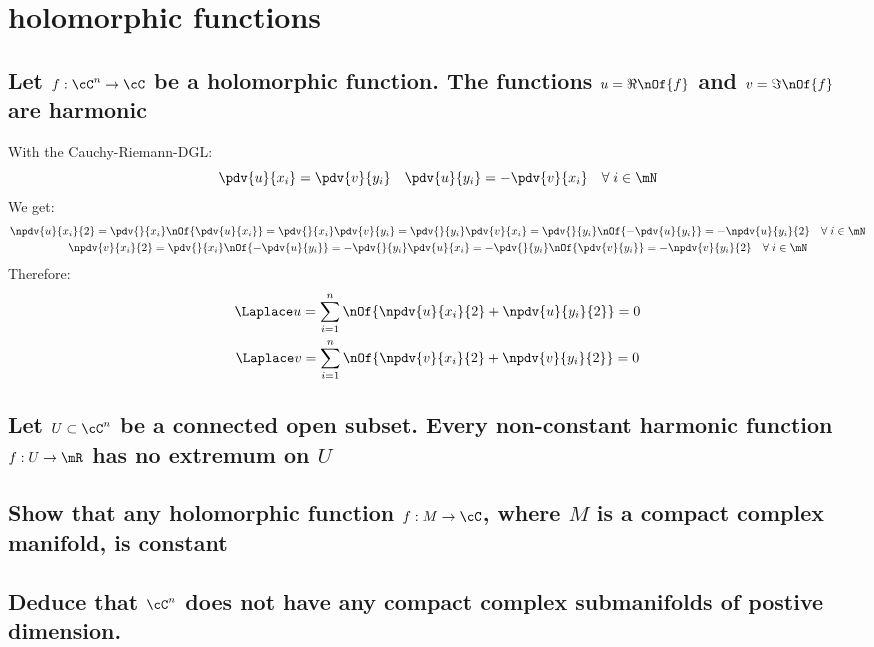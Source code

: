 \documentclass[11pt,a4paper]{scrartcl}
\begin{document}
	\section{holomorphic functions}

	\subsection{Let $f : \cC^n \to \cC$ be a holomorphic function.	The functions $u=\Re\nOf{f}$ and $v=\Im\nOf{f}$ are harmonic}
	With the Cauchy-Riemann-DGL:
	\begin{equation}
		\pdv{u}{x_i} = \pdv{v}{y_i} \quad \pdv{u}{y_i} = - \pdv{v}{x_i} \quad \forall\; i\in\mN
	\end{equation}
	We get:
	\begin{gather}
		\npdv{u}{x_i}{2}  = \pdv{}{x_i}\nOf{\pdv{u}{x_i}} = \pdv{}{x_i} \pdv{v}{y_i} = \pdv{}{y_i}\pdv{v}{x_i} = \pdv{}{y_i}\nOf{-\pdv{u}{y_i}} = - \npdv{u}{y_i}{2} \quad \forall\; i\in\mN\\
		\npdv{v}{x_i}{2}  = \pdv{}{x_i}\nOf{-\pdv{u}{y_i}} = - \pdv{}{y_i}\pdv{u}{x_i} = - \pdv{}{y_i}\nOf{\pdv{v}{y_i}} = - \npdv{v}{y_i}{2} \quad \forall\; i\in\mN
	\end{gather}
	Therefore:
	\begin{gather}
		\Laplace u = \sum\limits_{i=1}^n \nOf{\npdv{u}{x_i}{2} + \npdv{u}{y_i}{2}} = 0 \\
		\Laplace v = \sum\limits_{i=1}^n \nOf{\npdv{v}{x_i}{2} + \npdv{v}{y_i}{2}} = 0
	\end{gather}

	\subsection{Let $U\subset \cC^n$ be a connected open subset. Every non-constant harmonic function $f : U \to \mR$ has no extremum on $U$}

	\subsection{Show that any holomorphic function $f:M \to \cC$, where $M$ is a compact complex manifold, is constant}

	\subsection{Deduce that $\cC^n$ does not have any compact complex submanifolds of postive dimension.}
\end{document}
